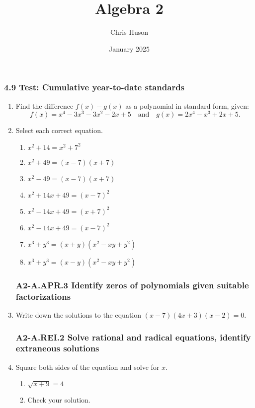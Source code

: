 \documentclass[12pt, twoside]{article}
\title{Algebra 2}
\author{Chris Huson}
\date{January 2025}
\begin{document}
\subsubsection*{4.9 Test: Cumulative year-to-date standards}
\begin{enumerate}[itemsep=0.5cm]
\subsubsection*{A1-APR.1 Perform operations with polynomials}
\item Find the difference \(f(x) - g(x)\) as a polynomial in standard form, given:
\[
f(x) = x^4 - 3x^3 - 3x^2 - 2x + 5 \quad \text{and} \quad g(x) = 2x^4 - x^3 + 2x + 5.
\] \vspace{3cm}

\item Select each correct equation.
\begin{multicols}{2}
    \begin{enumerate}
    \item $x^2 + 14 = x^2 + 7^2$
    \item $x^2 + 49 = (x-7)(x+7)$
    \item $x^2 - 49 = (x-7)(x+7)$
    \item $x^2 + 14x + 49 = (x-7)^2$
    \item $x^2 - 14x + 49 = (x+7)^2$
    \item $x^2 - 14x + 49 = (x-7)^2$    
    \item \(x^3 + y^3 = (x + y)(x^2 - xy + y^2)\)
    \item \(x^3 + y^3 = (x - y)(x^2 - xy + y^2)\)
    \end{enumerate}
\end{multicols}

\subsubsection*{A2-A.APR.3 Identify zeros of polynomials given suitable factorizations}
\item Write down the solutions to the equation $(x - 7)(4x + 3)(x - 2) = 0$. \vspace{2cm} 

\subsubsection*{A2-A.REI.2 Solve rational and radical equations, identify extraneous solutions}
\item Square both sides of the equation and solve for $x$.
    \begin{multicols}{2}
    \begin{enumerate}[itemsep=0.5cm]
        \item  $\sqrt{x + 9}=4$
        \item Check your solution.
    \end{enumerate}
    \end{multicols} \vspace{3cm}


\end{enumerate}
\end{document}
